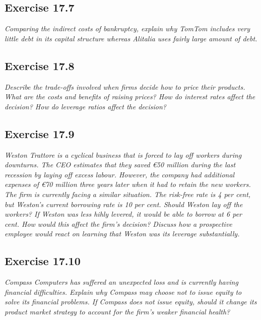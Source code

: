 \documentclass[]{book}
\newcommand{\euro}{€}
\theoremstyle{definition}
\theoremstyle{definition}
\theoremstyle{remark}
\begin{document}
\subsection{Exercise 17.7}\label{exercise-17.7}

\emph{Comparing the indirect costs of bankruptcy, explain why TomTom
includes very little debt in its capital structure whereas Alitalia uses
fairly large amount of debt.} \citep[p.576]{book}

\subsection{Exercise 17.8}\label{exercise-17.8}

\emph{Describe the trade-offs involved when firms decide how to price
their products. What are the costs and benefits of raising prices? How
do interest rates affect the decision? How do leverage ratios affect the
decision?} \citep[p.576]{book}

\subsection{Exercise 17.9}\label{exercise-17.9}

\emph{Weston Trattore is a cyclical business that is forced to lay off
workers during downturns. The CEO estimates that they saved \euro{}50
million during the last recession by laying off excess labour. However,
the company had additional expenses of \euro{}70 million three years
later when it had to retain the new workers. The firm is currently
facing a similar situation. The risk-free rate is 4 per cent, but
Weston's current borrowing rate is 10 per cent. Should Weston lay off
the workers? If Weston was less hihly levered, it would be able to
borrow at 6 per cent. How would this affect the firm's decision? Discuss
how a prospective employee would react on learning that Weston was its
leverage substantially.} \citep[p.576]{book}

\subsection{Exercise 17.10}\label{exercise-17.10}

\emph{Compass Computers has suffered an unexpected loss and is currently
having financial difficulties. Explain why Compass may choose not to
issue equity to solve its financial problems. If Compass does not issue
equity, should it change its product market strategy to account for the
firm's weaker financial health?} \citep[p.576]{book}
\end{document}
